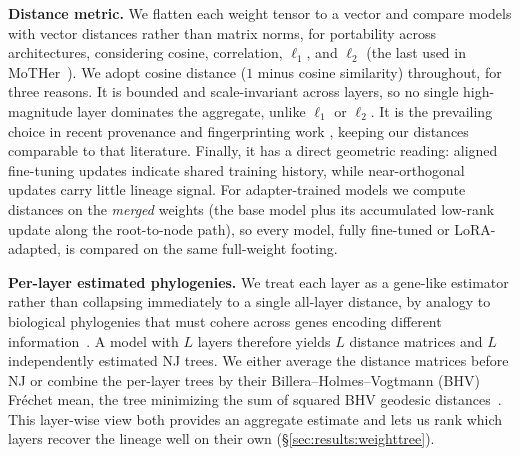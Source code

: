 \documentclass{article}
\theoremstyle{definition}
\theoremstyle{plain}
\begin{document}
\textbf{Distance metric.}\label{sec:framework:metric}
We flatten each weight tensor to a vector and compare models with vector distances rather than matrix
norms, for portability across architectures, considering cosine, correlation, $\ell_1$, and $\ell_2$
(the last used in MoTHer~\citep{horwitz2025mother}). We adopt cosine distance ($1$ minus cosine
similarity) throughout, for three reasons. It is bounded and scale-invariant across layers, so no single
high-magnitude layer dominates the aggregate, unlike $\ell_1$ or $\ell_2$. It is the prevailing choice in
recent provenance and fingerprinting work \citep{zeng2024huref, behavioral2026provenance,
zhu2025independence}, keeping our distances comparable to that literature. Finally, it has a direct geometric
reading: aligned fine-tuning updates indicate shared training history, while near-orthogonal updates carry little lineage signal. For adapter-trained models we compute distances on the \emph{merged} weights (the base model plus
its accumulated low-rank update along the root-to-node path), so every model, fully fine-tuned or
LoRA-adapted, is compared on the same full-weight footing.





\textbf{Per-layer estimated phylogenies.}
We treat each layer as a gene-like estimator rather than collapsing immediately to a single all-layer
distance, by analogy to biological phylogenies that must cohere across genes encoding different
information~\citep{maddison1997gene}. A model with $L$ layers therefore yields $L$ distance matrices and
$L$ independently estimated NJ trees. We either average the distance matrices before NJ or combine the
per-layer trees by their Billera--Holmes--Vogtmann (BHV) Fr\'echet mean, the tree minimizing the sum of
squared BHV geodesic distances~\citep{billera2001geometry, willis2019confidence}. This layer-wise view
both provides an aggregate estimate and lets us rank which layers recover the lineage well on their own
(\S\ref{sec:results:weighttree}).
\end{document}
